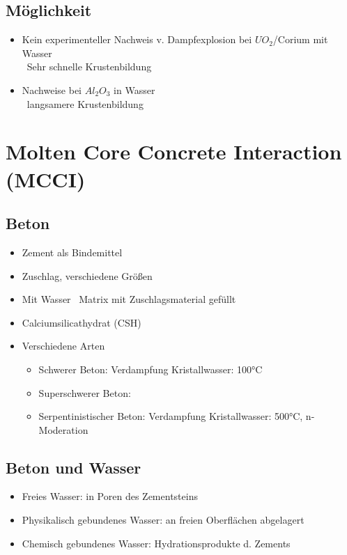 \documentclass[12pt]{article}
\begin{document}
\subsection{Möglichkeit}
\begin{itemize}
  \item Kein experimenteller Nachweis v. Dampfexplosion bei \(UO_2\)/Corium mit Wasser\\
  \textrightarrow\ Sehr schnelle Krustenbildung
  \item Nachweise bei \(Al_2O_3\) in Wasser\\
  \textrightarrow\ langsamere Krustenbildung
\end{itemize}

\section{Molten Core Concrete Interaction (MCCI)}

\subsection{Beton}
\begin{itemize}
  \item Zement als Bindemittel
  \item Zuschlag, verschiedene Größen
  \item Mit Wasser \textrightarrow\ Matrix mit Zuschlagsmaterial gefüllt
  \item Calciumsilicathydrat (CSH)
  \item Verschiedene Arten
  \begin{itemize}
    \item Schwerer Beton: Verdampfung Kristallwasser: 100°C
    \item Superschwerer Beton: 
    \item Serpentinistischer Beton: Verdampfung Kristallwasser: 500°C, n-Moderation
  \end{itemize}
\end{itemize}

\subsection{Beton und Wasser}
\begin{itemize}
  \item Freies Wasser: in Poren des Zementsteins
  \item Physikalisch gebundenes Wasser: an freien Oberflächen abgelagert
  \item Chemisch gebundenes Wasser: Hydrationsprodukte d. Zements
\end{itemize}
\end{document}
